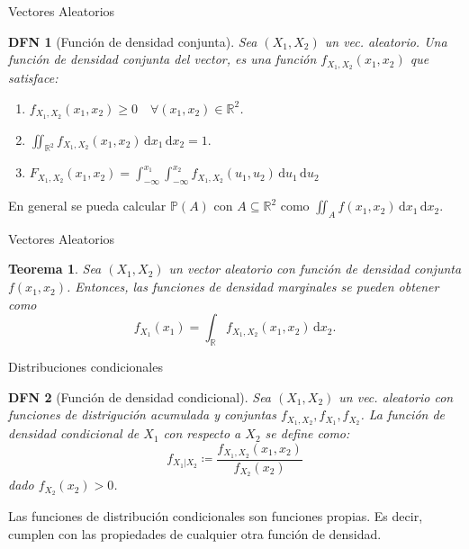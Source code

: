 \documentclass[a4paper]{article}
\newtheorem{definition}{DFN}
\theoremstyle{mytheoremstyle}
\newtheorem{theorem}{Teorema}
\newcommand{\IP}{\mathbb{P}}
\newcommand{\R}{\mathbb{R}}
\newcommand{\1}{\mathds{1}}
\newcommand{\diff}[1]{\,\mathrm{d}#1}
\begin{document}
\begin{multicols*}{3}
\begin{roundbox}{Vectores Aleatorios}
\begin{definition}[Función de densidad conjunta]
    Sea $(X_1, X_2)$ un vec. aleatorio.
    Una función de densidad conjunta del vector, es una función $f_{X_1, X_2} (x_1, x_2)$ que satisface:
    \begin{enumerate}
        \item $f_{X_1, X_2} (x_1, x_2) \geq 0 \quad \forall (x_1, x_2) \in \R^2$.
        \item $\iint_{\R^2} f_{X_1, X_2} (x_1, x_2) \diff{x_1} \diff{x_2} = 1.$
        \item $F_{X_1, X_2} (x_1, x_2) = \int_{-\infty}^{x_1} \int_{-\infty}^{x_2} f_{X_1, X_2} (u_1, u_2) \diff{u_1} \diff{u_2} $
    \end{enumerate}
\end{definition}

En general se pueda calcular $\IP(A)$ con $A \subseteq \R^{2}$ como $\iint_{A} f(x_1, x_2) \diff{x_1} \diff{x_2}$.
\end{roundbox}

\begin{roundbox}{Vectores Aleatorios}
\begin{theorem}
    Sea $(X_1, X_2)$ un vector aleatorio con función de densidad conjunta $f(x_1, x_2)$.
    Entonces, las funciones de densidad marginales se pueden obtener como
    \begin{equation*}
        f_{X_1}(x_1) = \int_{\R} f_{X_1, X_2} (x_1, x_2) \diff{x_2}.
    \end{equation*}
\end{theorem}
\end{roundbox}

\begin{roundbox}{Distribuciones condicionales}
\begin{definition}[Función de densidad condicional]
    Sea $(X_1, X_2)$ un vec. aleatorio con funciones de distrigución acumulada y conjuntas $f_{X_1, X_2}, f_{X_1}, f_{X_2}$.
    La función de densidad condicional de $X_1$ con respecto a $X_2$ se define como:
    \begin{equation*}
        f_{X_1 | X_2} \coloneqq \frac{f_{X_1, X_2}(x_1, x_2)}{f_{X_2}(x_2)}
    \end{equation*}
    dado $f_{X_2}(x_2) > 0$.
\end{definition}

Las funciones de distribución condicionales son funciones propias.
Es decir, cumplen con las propiedades de cualquier otra función de densidad.


\end{roundbox}
\end{multicols*}
\end{document}
